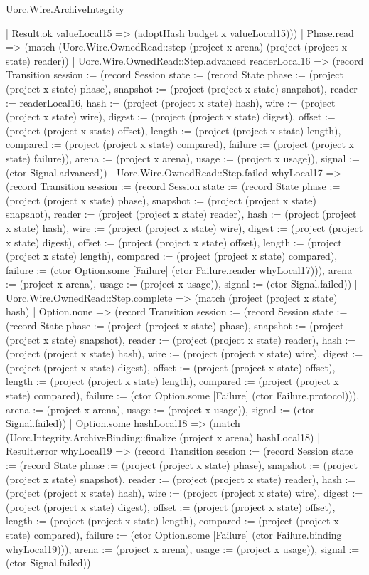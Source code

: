 \begin{lexlean}{Uorc.Wire.ArchiveIntegrity}
\begin{semanticmodule}
{          | Result.ok valueLocal15 => (adoptHash budget x valueLocal15)))
      | Phase.read => (match (Uorc.Wire.OwnedRead::step (project x arena) (project (project x state) reader))
        | Uorc.Wire.OwnedRead::Step.advanced readerLocal16 => (record Transition {session := (record Session {state := (record State {phase := (project (project x state) phase), snapshot := (project (project x state) snapshot), reader := readerLocal16, hash := (project (project x state) hash), wire := (project (project x state) wire), digest := (project (project x state) digest), offset := (project (project x state) offset), length := (project (project x state) length), compared := (project (project x state) compared), failure := (project (project x state) failure)}), arena := (project x arena), usage := (project x usage)}), signal := (ctor Signal.advanced)})
        | Uorc.Wire.OwnedRead::Step.failed whyLocal17 => (record Transition {session := (record Session {state := (record State {phase := (project (project x state) phase), snapshot := (project (project x state) snapshot), reader := (project (project x state) reader), hash := (project (project x state) hash), wire := (project (project x state) wire), digest := (project (project x state) digest), offset := (project (project x state) offset), length := (project (project x state) length), compared := (project (project x state) compared), failure := (ctor Option.some [Failure] (ctor Failure.reader whyLocal17))}), arena := (project x arena), usage := (project x usage)}), signal := (ctor Signal.failed)})
        | Uorc.Wire.OwnedRead::Step.complete => (match (project (project x state) hash)
          | Option.none => (record Transition {session := (record Session {state := (record State {phase := (project (project x state) phase), snapshot := (project (project x state) snapshot), reader := (project (project x state) reader), hash := (project (project x state) hash), wire := (project (project x state) wire), digest := (project (project x state) digest), offset := (project (project x state) offset), length := (project (project x state) length), compared := (project (project x state) compared), failure := (ctor Option.some [Failure] (ctor Failure.protocol))}), arena := (project x arena), usage := (project x usage)}), signal := (ctor Signal.failed)})
          | Option.some hashLocal18 => (match (Uorc.Integrity.ArchiveBinding::finalize (project x arena) hashLocal18)
            | Result.error whyLocal19 => (record Transition {session := (record Session {state := (record State {phase := (project (project x state) phase), snapshot := (project (project x state) snapshot), reader := (project (project x state) reader), hash := (project (project x state) hash), wire := (project (project x state) wire), digest := (project (project x state) digest), offset := (project (project x state) offset), length := (project (project x state) length), compared := (project (project x state) compared), failure := (ctor Option.some [Failure] (ctor Failure.binding whyLocal19))}), arena := (project x arena), usage := (project x usage)}), signal := (ctor Signal.failed)})
}
\end{semanticmodule}
\end{lexlean}
